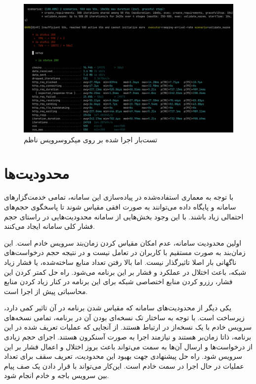 \begin{figure}
	\centering
	\includegraphics[width=1\linewidth]{figures/k6-nazem}
	\caption{تست‌بار اجرا شده بر روی میکروسرویس ناظم}
	\label{fig:k6-nazem}
\end{figure}



\section{محدودیت‌ها}
با توجه به معماری استفاده‌شده در پیاده‌سازی این سامانه، تمامی خدمت‌گزار‌های سامانه و پایگاه داده می‌توانند به صورت افقی مقیاس شوند تا پاسخگوی حجم‌های احتمالی زیاد باشند. با این وجود بخش‌هایی از سامانه محدودیت‌هایی در راستای حجم فشار کلی سامانه ایجاد می‌کنند.


اولین محدودیت سامانه، عدم امکان مقیاس کردن زمان‌بند سرویس خادم است. این زمان‌بند به صورت مستقیم با کاربران در تعامل نیست و در نتیجه حجم درخواست‌های ناگهانی بار اصلا تاثیرگذار نیست. اما بالا رفتن تعداد منابع ساخته‌شده، یا فشار زیاد شبکه، باعث اختلال در عملکرد و فشار بر این برنامه می‌شود. راه حل کمتر کردن این فشار، رزرو کردن منابع اختصاصی شبکه برای این برنامه در کنار زیاد کردن منابع محاسباتی پیش از اجرا است.

یکی دیگر از محدودیت‌های سامانه که مقیاس شدن برنامه در آن تاثیر کمی دارد، زیرساخت  است. با توجه به ساختار تک نسخه‌ای بودن آن در برنامه، تمامی نسخه‌های سرویس خادم با یک نسخه‌از  در ارتباط هستند. از آنجایی که عملیات تعریف شده در این برنامه، ذاتا زمان‌بر هستند و نیازمند اجرا به صورت آسنکرون هستند. اجرای حجم زیادی از درخواست‌ها و ارسال آن‌ها به سمت  می‌تواند باعث بروز اختلال و اعمال فشار بر این سرویس شود. راه حل پیشنهادی جهت بهبود این محدودیت، تعریف سقف برای تعداد عملیات در حال اجرا در سمت خادم است. این‌کار می‌تواند با قرار دادن یک صف پیام بین سرویس باجه و خادم انجام شود.

\clearpage
